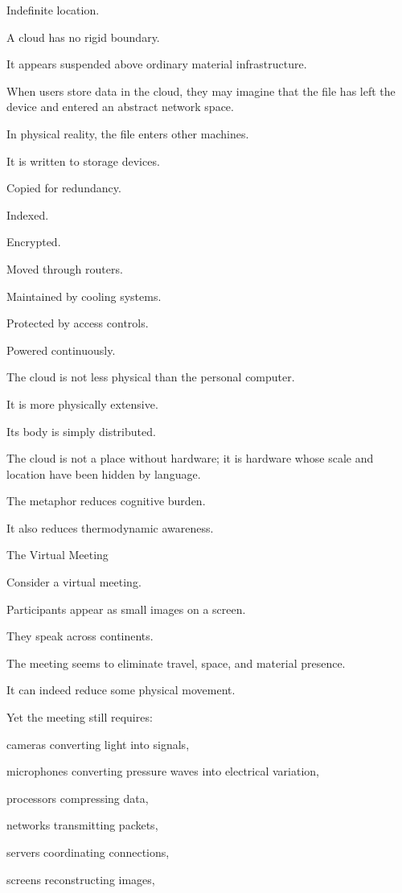 Indefinite location.

A cloud has no rigid boundary.

It appears suspended above ordinary material infrastructure.

When users store data in the cloud, they may imagine that the file has left the device and entered an abstract network space.

In physical reality, the file enters other machines.

It is written to storage devices.

Copied for redundancy.

Indexed.

Encrypted.

Moved through routers.

Maintained by cooling systems.

Protected by access controls.

Powered continuously.

The cloud is not less physical than the personal computer.

It is more physically extensive.

Its body is simply distributed.

The cloud is not a place without hardware; it is hardware whose scale and location have been hidden by language.

The metaphor reduces cognitive burden.

It also reduces thermodynamic awareness.

The Virtual Meeting

Consider a virtual meeting.

Participants appear as small images on a screen.

They speak across continents.

The meeting seems to eliminate travel, space, and material presence.

It can indeed reduce some physical movement.

Yet the meeting still requires:

cameras converting light into signals,

microphones converting pressure waves into electrical variation,

processors compressing data,

networks transmitting packets,

servers coordinating connections,

screens reconstructing images,

